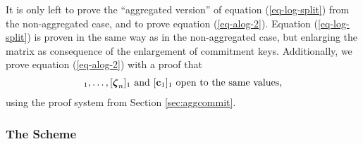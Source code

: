 It is only left to prove the ``aggregated version'' of equation (\ref{eq-log-split}) from the non-aggregated case,  and to prove equation (\ref{eq-alog-2}).
Equation (\ref{eq-log-split}) is proven in the same way as in the non-aggregated case, but enlarging the matrix as consequence of the enlargement of commitment keys. Additionally, we prove equation (\ref{eq-alog-2}) with a proof that
\begin{align*}
[\grkb{\zeta}_1]_1,\ldots,[\grkb{\zeta}_n]_1 \text{ and } [\vecb{c}_1]_1 \text{ open to the same values,}
\end{align*}
using the proof system from Section \ref{sec:aggcommit}.
\iffalse
We prove soundness in the same fashion as the protocols from Chapter \ref{sec:shuf-rp}, that is we guess the index $j^*$ of an element $x_{j^*}\notin S$ in order to choose $\vecb{h}_{j^*}$ linearly independent from the other vectors in $ck$. Similarly as in the non-aggregated case, we will guess the (sub-)path $(b_{j^*,m+1},\ldots, b_{j^*,1})$ (where $b_{j^*,1},\ldots,b_{j^*,m}$ are the uniques openings of, respectively, $[\vecb{d}_1]_2,\ldots,[\vecb{d}]_m$ at position $j^*$) and we will choose, for each $\ell\in[m]$, $\vecb{g}_{\ell,\alpha_{j^*,\ell}}$ linearly independent from the other vectors in $ck_\ell$, where $\alpha_{j^*,\ell}:=(\alpha_{j^*}-1 \mod 2^{\ell-1})+1$. With such choice of the commitment keys, we will be able to prove that $x_{j^*}=s_{\alpha_{j^*}}$ unless we can break some hardness assumption.
Consequently, the total security loss in the reduction will be of a factor of $\frac{2}{nt}$.  
\fi
\subsubsection{The Scheme}

